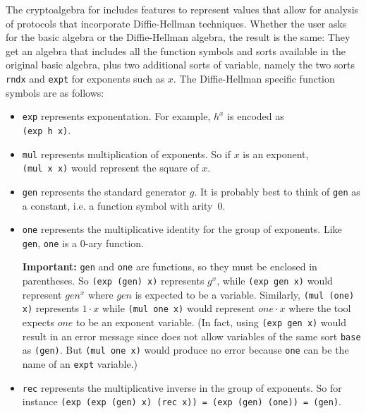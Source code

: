 The cryptoalgebra for {\cpsa} includes features to represent values
that allow for analysis of protocols that incorporate Diffie-Hellman
techniques.  Whether the user asks for the basic algebra or the
Diffie-Hellman algebra, the result is the same: They get an algebra
that includes all the function symbols and sorts available in the
original basic algebra, plus two additional sorts of variable, namely
the two sorts \texttt{rndx} and \texttt{expt} for exponents such as
$x$.
%   
%   
The Diffie-Hellman specific function symbols are as follows:

\begin{itemize}
\item \texttt{exp} represents exponentation.  For example, $h^x$ is
encoded as \\ \texttt{(exp h x)}.
\item \texttt{mul} represents multiplication of exponents.  So if $x$
is an exponent, \\ \texttt{(mul x x)} would represent the square of $x$.
\item \texttt{gen} represents the standard generator $g$.  It is
  probably best to think of \texttt{gen} as a constant, i.e. a
  function symbol with arity~0.

\item \texttt{one} represents the multiplicative identity for the group of
exponents.  Like \texttt{gen}, \texttt{one} is a 0-ary function.

{\bf Important: } \texttt{gen} and \texttt{one} are functions, so they
must be enclosed in parentheses.  So \texttt{(exp (gen) x)} represents
$g^x$, while \texttt{(exp gen x)} would represent ${gen}^x$ where
${gen}$ is expected to be a variable.  Similarly, \texttt{(mul (one)
  x)} represents $1 \cdot x$ while \texttt{(mul one x)} would
represent $one \cdot x$ where the tool expects $one$ to be an exponent
variable. (In fact, using \texttt{(exp gen x)} would result in an
error message since {\cpsa} does not allow variables of the same sort
\texttt{base} as \texttt{(gen)}. But \texttt{(mul one x)} would
produce no error because \texttt{one} can be the name of an
\texttt{expt} variable.)

\item \texttt{rec} represents the multiplicative inverse in the group
  of exponents.  So for instance \texttt{(exp (exp (gen) x) (rec x)) =
    (exp (gen) (one)) = (gen)}.
\end{itemize}


